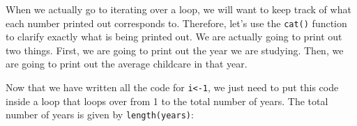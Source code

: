 \documentclass[
]{book}
\newenvironment{Shaded}{\begin{snugshade}}{\end{snugshade}}
\newcommand{\CommentTok}[1]{\textcolor[rgb]{0.56,0.35,0.01}{\textit{#1}}}
\newcommand{\ControlFlowTok}[1]{\textcolor[rgb]{0.13,0.29,0.53}{\textbf{#1}}}
\newcommand{\DecValTok}[1]{\textcolor[rgb]{0.00,0.00,0.81}{#1}}
\newcommand{\FloatTok}[1]{\textcolor[rgb]{0.00,0.00,0.81}{#1}}
\newcommand{\FunctionTok}[1]{\textcolor[rgb]{0.13,0.29,0.53}{\textbf{#1}}}
\newcommand{\NormalTok}[1]{#1}
\newcommand{\OtherTok}[1]{\textcolor[rgb]{0.56,0.35,0.01}{#1}}
\newcommand{\SpecialCharTok}[1]{\textcolor[rgb]{0.81,0.36,0.00}{\textbf{#1}}}
\newcommand{\StringTok}[1]{\textcolor[rgb]{0.31,0.60,0.02}{#1}}
\begin{document}
When we actually go to iterating over a loop, we will want to keep track of what each number printed out corresponds to. Therefore, let's use the \texttt{cat()} function to clarify exactly what is being printed out. We are actually going to print out two things. First, we are going to print out the year we are studying. Then, we are going to print out the average childcare in that year.

\begin{Shaded}
\end{Shaded}

Now that we have written all the code for \texttt{i\textless{}-1}, we just need to put this code inside a loop that loops over from 1 to the total number of years. The total number of years is given by \texttt{length(years)}:

\begin{Shaded}
\end{Shaded}
\end{document}
